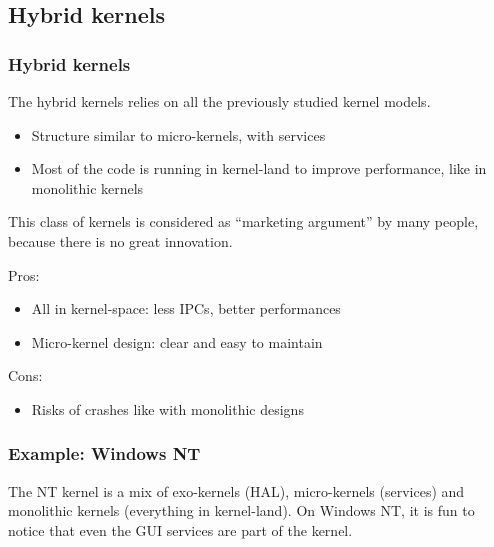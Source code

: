 %
%

\subsection{Hybrid kernels}

%
%

\begin{frame}
  \frametitle{Hybrid kernels}

  The hybrid kernels relies on all the previously studied kernel
  models.

  \begin{itemize}
  \item
    Structure similar to micro-kernels, with services
  \item
    Most of the code is running in kernel-land to improve performance,
    like in monolithic kernels
  \end{itemize}

  This class of kernels is considered as ``marketing argument'' by
  many people, because there is no great innovation.

  \-

  Pros:

  \begin{itemize}
  \item
    All in kernel-space: less IPCs, better performances
  \item
    Micro-kernel design: clear and easy to maintain
  \end{itemize}

  \-

  Cons:

  \begin{itemize}
  \item
    Risks of crashes like with monolithic designs
  \end{itemize}

\end{frame}

%
%

\begin{frame}
  \frametitle{Example: Windows NT}

  \begin{center}
  \end{center}

  The NT kernel is a mix of exo-kernels (HAL), micro-kernels
  (services) and monolithic kernels (everything in kernel-land). On
  Windows NT, it is fun to notice that even the GUI services are part
  of the kernel.

\end{frame}

